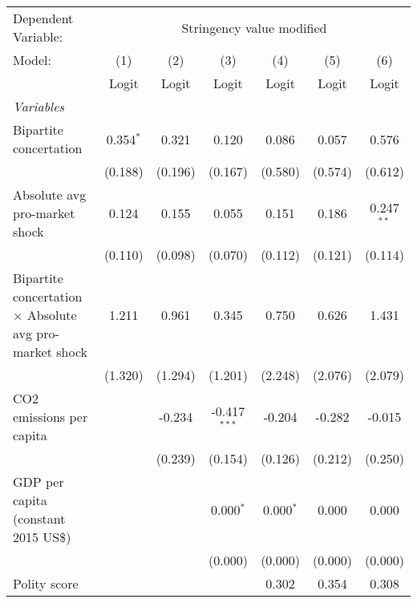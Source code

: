 
\begingroup
\centering
\begin{tabular}{lcccccc}
   \toprule
   Dependent Variable: & \multicolumn{6}{c}{Stringency value modified}\\
   Model:                                                         & (1)         & (2)     & (3)            & (4)         & (5)     & (6)\\  
                                                                  &  Logit      & Logit   & Logit          & Logit       & Logit   & Logit\\  
   \midrule
   \emph{Variables}\\
   Bipartite concertation                                         & 0.354$^{*}$ & 0.321   & 0.120          & 0.086       & 0.057   & 0.576\\   
                                                                  & (0.188)     & (0.196) & (0.167)        & (0.580)     & (0.574) & (0.612)\\   
   Absolute avg pro-market shock                                  & 0.124       & 0.155   & 0.055          & 0.151       & 0.186   & 0.247$^{**}$\\   
                                                                  & (0.110)     & (0.098) & (0.070)        & (0.112)     & (0.121) & (0.114)\\   
   Bipartite concertation $\times$ Absolute avg pro-market shock  & 1.211       & 0.961   & 0.345          & 0.750       & 0.626   & 1.431\\   
                                                                  & (1.320)     & (1.294) & (1.201)        & (2.248)     & (2.076) & (2.079)\\   
   CO2 emissions per capita                                       &             & -0.234  & -0.417$^{***}$ & -0.204      & -0.282  & -0.015\\   
                                                                  &             & (0.239) & (0.154)        & (0.126)     & (0.212) & (0.250)\\   
   GDP per capita (constant 2015 US\$)                            &             &         & 0.000$^{*}$    & 0.000$^{*}$ & 0.000   & 0.000\\   
                                                                  &             &         & (0.000)        & (0.000)     & (0.000) & (0.000)\\   
   Polity score                                                   &             &         &                & 0.302       & 0.354   & 0.308\\   

\end{tabular}
